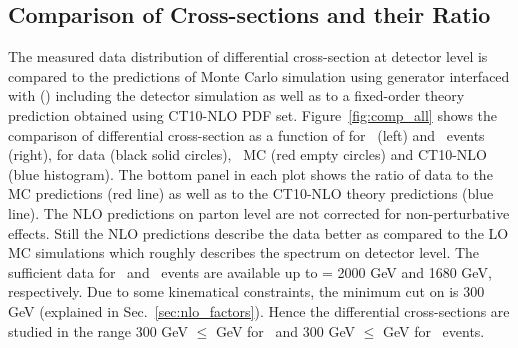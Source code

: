 \subsection{Comparison of Cross-sections and their Ratio}
The measured data distribution of differential cross-section at detector level is compared to the predictions of Monte Carlo simulation using \MadGraphF generator interfaced with \PYTHIAS (\MGP) including the detector simulation as well as to a fixed-order theory prediction obtained using CT10-NLO PDF set. Figure~\ref{fig:comp_all} shows the comparison of differential cross-section as a function of \httwo for \njt~(left) and \njth~events (right), for data (black solid circles), \MGP~MC (red empty circles) and CT10-NLO (blue histogram). The bottom panel in each plot shows the ratio of data to the MC predictions (red line) as well as to the CT10-NLO theory predictions (blue line). The NLO predictions on parton level are not corrected for non-perturbative effects. Still the NLO predictions describe the data better as compared to the LO MC simulations which roughly describes the spectrum on detector level. The sufficient data for \njt~and \njth~events are available up to \httwo = 2000 GeV and 1680 GeV, respectively. Due to some kinematical constraints, the minimum cut on \httwo is 300 GeV (explained in Sec.~\ref{sec:nlo_factors}). Hence the differential cross-sections are studied in the range 300 GeV $\leq$ \httwo {} GeV for \njt~and 300 GeV $\leq$ \httwo {} GeV for \njth~events.

